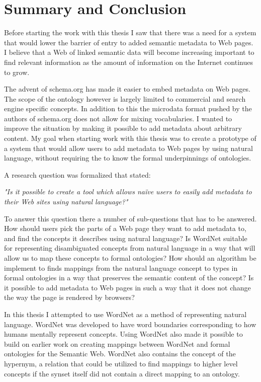 \chapter{Summary and Conclusion} %
\label{Conclusion} %
Before starting the work with this thesis I saw that there was a need for a system that would lower the barrier of
entry to added semantic metadata to Web pages.
I believe that a Web of linked semantic data will become increasing important to find relevant information as the amount
of information on the Internet continues to grow.

The advent of schema.org has made it easier to embed metadata on Web pages.
The scope of the ontology however is largely limited to commercial and search engine specific concepts.
In addition to this the microdata format pushed by the authors of schema.org does not allow for mixing vocabularies.
I wanted to improve the situation by making it possible to add metadata about arbitrary content.
My goal when starting work with this thesis was to create a prototype of a system that would allow users to add metadata to Web pages by using natural language,
without requiring the to know the formal underpinnings of ontologies.

A research question was formalized that stated:

\emph{"Is it possible to create a tool which allows naïve users to easily add metadata to their Web sites using natural language?"}

To answer this question there a number of sub-questions that has to be answered.
How should users pick the parts of a Web page they want to add metadata to, and find the concepts it describes using natural language?
Is WordNet suitable for representing disambiguated concepts from natural language in a way that will allow us to map these concepts to formal ontologies?
How should an algorithm be implement to finds mappings from the natural language concept to types in
formal ontologies in a way that preserves the semantic content of the concept?
Is it possible to add metadata to Web pages in such a way that it does not change the way the page is rendered by browsers?

In this thesis I attempted to use WordNet as a method of representing natural language.
WordNet was developed to have word boundaries corresponding to how humans mentally represent concepts.
Using WordNet also made it possible to  build on earlier work on creating mappings between WordNet and formal ontologies for the Semantic Web.
WordNet also contains the concept of the hypernym, a relation that could be utilized to find mappings to higher level concepts
if the synset itself did not contain a direct mapping to an ontology.

